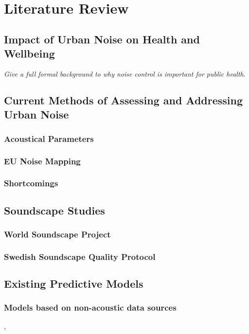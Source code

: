 \chapter{Literature Review}
\label{ch:lit}

\section{Impact of Urban Noise on Health and Wellbeing}

  \emph{Give a full formal background to why noise control is important for public health}.

\section{Current Methods of Assessing and Addressing Urban Noise}

  \subsection{Acoustical Parameters}

  \subsection{EU Noise Mapping}

  \subsection{Shortcomings}

\section{Soundscape Studies}

  \subsection{World Soundscape Project}

  \subsection{Swedish Soundscape Quality Protocol}

\section{Existing Predictive Models}

  \cite{Lionello2020}

  \subsection{Models based on non-acoustic data sources}
    \cite{Verma2020}, \cite{Gasco2020}

